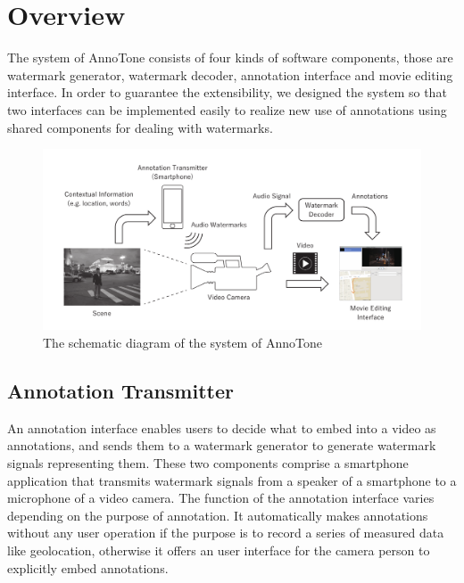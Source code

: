 \chapter{Overview}

The system of AnnoTone consists of four kinds of software components, those are watermark generator, watermark decoder, annotation interface and movie editing interface.
In order to guarantee the extensibility, we designed the system so that two interfaces can be implemented easily to realize new use of annotations using shared components for dealing with watermarks.

\begin{figure}[htbp]
 \begin{center}
  \vspace{5mm}
  \includegraphics[width=150mm]{overview.pdf}
 \end{center}
 \caption{The schematic diagram of the system of AnnoTone}
 \label{fig:one}
\end{figure}

\section{Annotation Transmitter}
An annotation interface enables users to decide what to embed into a video as annotations, and sends them to a watermark generator to generate watermark signals representing them.
These two components comprise a smartphone application that transmits watermark signals from a speaker of a smartphone to a microphone of a video camera.
The function of the annotation interface varies depending on the purpose of annotation.
It automatically makes annotations without any user operation if the purpose is to record a series of measured data like geolocation, otherwise it offers an user interface for the camera person to explicitly embed annotations.

